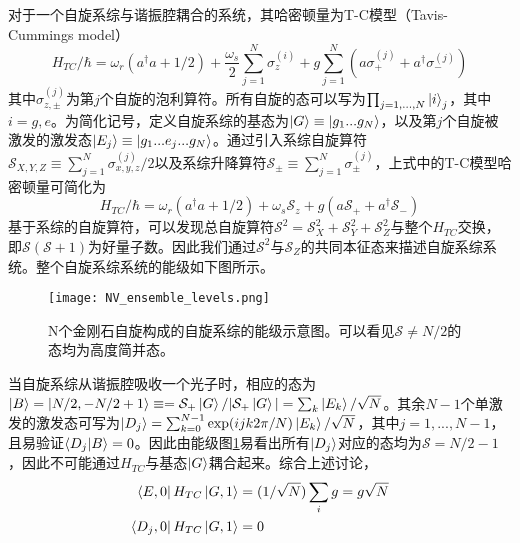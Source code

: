             对于一个自旋系综与谐振腔耦合的系统，其哈密顿量为T-C模型（Tavis-Cummings model）\cite{tavis1968exact}
            \begin{equation}
                \label{eqn:T-C_model}
                H_{TC}/\hbar = \omega_r (a^\dagger a + 1/2) + \frac{\omega_s}{2} \sum^N_{j=1} \sigma_z^{(i)} + g\sum^N_{j=1}( a \sigma_+^{(j)} + a^\dagger \sigma_-^{(j)} )
            \end{equation}
            其中$ \sigma^{(j)}_{z,\pm} $为第$j$个自旋的泡利算符。所有自旋的态可以写为$\prod_{j=1,...,N} \ket{i}_j $，其中$i=g,e$。为简化记号，定义自旋系综的基态为$\ket G \equiv \ket{g_1 ... g_N} $，以及第$j$个自旋被激发的激发态$\ket {E_j} \equiv \ket{g_1...e_j...g_N} $。通过引入系综自旋算符$ \mathcal S_{X,Y,Z} \equiv \sum^N_{j=1} \sigma^{(j)}_{x,y,z}/2 $以及系综升降算符$ \mathcal S_{\pm} \equiv \sum^N_{j=1} \sigma^{(j)}_{\pm} $，上式中的T-C模型哈密顿量可简化为
            \begin{equation}
                \label{eqn:TC_model_simplified}
                H_{TC}/\hbar = \omega_r (a^\dagger a + 1/2) + \omega_s \mathcal S_z + g( a \mathcal S_+ + a^\dagger \mathcal S_- )
            \end{equation}
            基于系综的自旋算符，可以发现总自旋算符$ \mathcal S^2  = \mathcal S_X^2 + \mathcal S_Y^2 + \mathcal S_Z^2 $与整个$H_{TC}$交换，即$ \mathcal S(\mathcal S+1) $为好量子数。因此我们通过$\mathcal S^2$与$\mathcal S_Z$的共同本征态来描述自旋系综系统。整个自旋系综系统的能级如下图所示。


            
            \begin{figure}[h]
                \centering
                \texttt{[image: NV\_ensemble\_levels.png]}
                \caption{N个金刚石自旋构成的自旋系综的能级示意图\cite{grezes2016towards}。可以看见$\mathcal S \neq N/2 $的态均为高度简并态。}
                \label{fig:NV_ensemble_levels}
            \end{figure}




            当自旋系综从谐振腔吸收一个光子时，相应的态为$\ket B = \ket{N/2, -N/2 + 1} \equiv = \mathcal S_+ \ket G/|\mathcal S_+ \ket G| = \sum_k \ket{E_k}/\sqrt N $。其余$N-1$个单激发的激发态可写为$\ket{D_j} = \sum^{N-1}_{k=0} \exp(ijk2\pi/N)\ket{E_k}/\sqrt N $，其中$j=1,...,N-1$，且易验证$\braket{D_j|B} = 0 $。因此由能级图\ref{fig:NV_ensemble_levels}易看出所有$\ket{D_j}$对应的态均为$\mathcal S = N/2-1$，因此不可能通过$H_{TC}$与基态$\ket{G}$耦合起来。综合上述讨论，
            \begin{align}
                \bra{E,0} H_{TC} \ket{G,1} &=(1/\sqrt N)\sum_i g = g\sqrt N\\
                \bra{D_j,0} H_{TC}\ket{G,1} &= 0
            \end{align}
            
